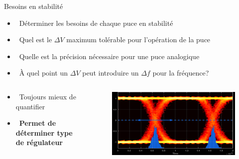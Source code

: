 \begin{frame}{Besoins en stabilité}
    \begin{itemize}
        \item[] \textcolor{UDSgreenFierte}{\faWater} ~Déterminer les besoins de chaque puce en stabilité
        \item[] \textcolor{UDSgreenFierte}{\faBatteryQuarter} ~Quel est le $\Delta V$ maximum tolérable pour l'opération de la puce
        \item[] \textcolor{UDSgreenFierte}{\faTachometer*} ~Quelle est la précision nécessaire pour une puce analogique
        \item[] \textcolor{UDSgreenFierte}{\faClock} ~À quel point un $\Delta V$ peut introduire un $\Delta f$ pour la fréquence?
    \end{itemize}

    \begin{columns}
        \begin{column}{0.5\textwidth}
             {
            \begin{itemize}
                \item[] \textcolor{UDSgreenFierte}{\faChartBar} ~Toujours mieux de quantifier
                \item[] \textcolor{UDSgreenFierte}{\faList} ~\textbf{Permet de déterminer type de régulateur}
            \end{itemize}
            }
        \end{column}
        \begin{column}{0.5\textwidth}
            \begin{figure}
                \includegraphics[width=\textwidth, height=0.45\textheight, keepaspectratio]{pictures/eye-diagram.png}
            \end{figure}
        \end{column}
    \end{columns}
\end{frame}


